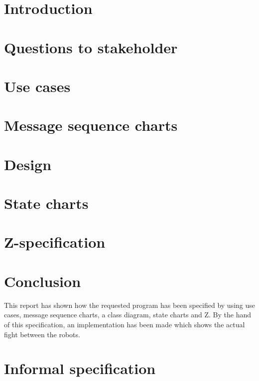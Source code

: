 \documentclass[a4paper,11pt]{article}
\begin{document}
	
	
	\tableofcontents
	\newpage
	
	\section{Introduction}
	
	\newpage

	\section{Questions to stakeholder}
	
	\newpage
	
	\section{Use cases}
	
	\newpage

	\section{Message sequence charts}
	
	\newpage

	\section{Design}
	
	\newpage

	\section{State charts}
	
	\newpage

	\section{Z-specification}
	
	\newpage

	\section{Conclusion}
	This report has shown how the requested program has been specified by using use cases, message sequence charts, a class diagram, state charts and Z. By the hand of this specification, an implementation has been made which shows the actual fight between the robots.
	\newpage

	\appendix
	\section{Informal specification}
		\label{appendix:informal}
		
\end{document}
